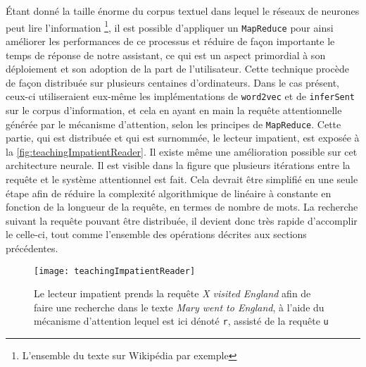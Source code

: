 Étant donné la taille énorme du corpus textuel dans lequel le réseaux de neurones peut lire l’information \footnote{L’ensemble du texte sur Wikipédia par exemple}, il est possible d’appliquer un \texttt{MapReduce} \cite{DeanMapReduce} pour ainsi améliorer les performances de ce processus et réduire de façon importante le temps de réponse de notre assistant, ce qui est un aspect primordial à son déploiement et son adoption de la part de l'utilisateur. Cette technique procède de façon distribuée sur plusieurs centaines d’ordinateurs. Dans le cas présent, ceux-ci utiliseraient eux-même les implémentations de \texttt{word2vec} et de \texttt{inferSent} sur le corpus d'information, et cela en ayant en main la requête attentionnelle générée par le mécanisme d'attention, selon les principes de \texttt{MapReduce}. Cette partie, qui est distribuée et qui est surnommée, le lecteur impatient, est exposée à la \autoref{fig:teachingImpatientReader}. Il existe même une amélioration possible sur cet architecture neurale. Il est visible dans la figure que plusieurs itérations entre la requête et le système attentionnel est fait. Cela devrait être simplifié en une seule étape afin de réduire la complexité algorithmique de linéaire à constante en fonction de la longueur de la requête, en termes de nombre de mots. La recherche suivant la requête pouvant être distribuée, il devient donc très rapide d'accomplir le celle-ci, tout comme l'ensemble des opérations décrites aux sections précédentes.

\begin{figure*}
  \centering
  \texttt{[image: teachingImpatientReader]}
  \caption{Le lecteur impatient prends la requête \textit{X visited England} afin de faire une recherche dans le texte \textit{Mary went to England}, à l’aide du mécanisme d’attention lequel est ici dénoté \texttt{r}, assisté de la requête \texttt{u} \cite{readNcomprehend}}
  \label{fig:teachingImpatientReader}
\end{figure*}
